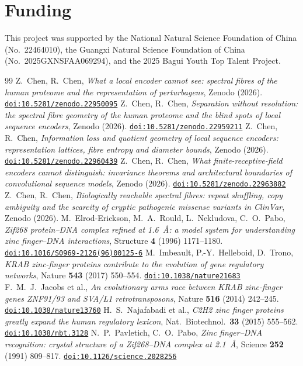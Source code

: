 \documentclass[11pt]{article}
\newcommand{\doi}[1]{\href{https://doi.org/#1}{\nolinkurl{doi:#1}}}
\theoremstyle{plain}
\theoremstyle{definition}
\theoremstyle{remark}
\begin{document}
\section*{Funding}
This project was supported by the National Natural Science Foundation of China (No.~22464010), the
Guangxi Natural Science Foundation of China (No.~2025GXNSFAA069294), and the 2025 Bagui Youth Top
Talent Project.

\begin{thebibliography}{99}
 Z.~Chen, R.~Chen, \emph{What a local encoder cannot see: spectral fibres of the human proteome
and the representation of perturbagens}, Zenodo (2026). \doi{10.5281/zenodo.22950095}
 Z.~Chen, R.~Chen, \emph{Separation without resolution: the spectral fibre geometry of the human
proteome and the blind spots of local sequence encoders}, Zenodo (2026). \doi{10.5281/zenodo.22959211}
 Z.~Chen, R.~Chen, \emph{Information loss and quotient geometry of local sequence encoders:
representation lattices, fibre entropy and diameter bounds}, Zenodo (2026). \doi{10.5281/zenodo.22960439}
 Z.~Chen, R.~Chen, \emph{What finite-receptive-field encoders cannot distinguish: invariance
theorems and architectural boundaries of convolutional sequence models}, Zenodo (2026).
\doi{10.5281/zenodo.22963882}
 Z.~Chen, R.~Chen, \emph{Biologically reachable spectral fibres: repeat shuffling, copy ambiguity
and the scarcity of cryptic pathogenic missense variants in ClinVar}, Zenodo (2026).
 M.~Elrod-Erickson, M.~A.~Rould, L.~Nekludova, C.~O.~Pabo, \emph{Zif268 protein--DNA complex
refined at 1.6~\AA: a model system for understanding zinc finger--DNA interactions}, Structure \textbf{4} (1996)
1171--1180. \doi{10.1016/S0969-2126(96)00125-6}
 M.~Imbeault, P.-Y.~Helleboid, D.~Trono, \emph{KRAB zinc-finger proteins contribute to the
evolution of gene regulatory networks}, Nature \textbf{543} (2017) 550--554. \doi{10.1038/nature21683}
 F.~M.~J.~Jacobs et al., \emph{An evolutionary arms race between KRAB zinc-finger genes ZNF91/93
and SVA/L1 retrotransposons}, Nature \textbf{516} (2014) 242--245. \doi{10.1038/nature13760}
 H.~S.~Najafabadi et al., \emph{C2H2 zinc finger proteins greatly expand the human
regulatory lexicon}, Nat.\ Biotechnol.\ \textbf{33} (2015) 555--562. \doi{10.1038/nbt.3128}
 N.~P.~Pavletich, C.~O.~Pabo, \emph{Zinc finger--DNA recognition: crystal structure of a
Zif268--DNA complex at 2.1~\AA}, Science \textbf{252} (1991) 809--817. \doi{10.1126/science.2028256}

\end{thebibliography}
\end{document}
